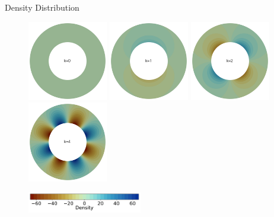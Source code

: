 \documentclass[10pt,aspectratio=169]{beamer}
\begin{document}
\begin{frame}[fragile]{Density Distribution}
	\begin{figure}[!htb]
		\begin{multicols}{4}
			\includegraphics[width=3.5cm]{./model_k_0_res_32_vdeg_2_pdeg_1_pcont_True_vel_penalty_1.0e+08_stokes_tol_1.0e-10/rho_ana.png}\par
			\hspace{0.75in}
			\includegraphics[width=3.5cm]{./model_k_1_res_32_vdeg_2_pdeg_1_pcont_True_vel_penalty_1.0e+08_stokes_tol_1.0e-10/rho_ana.png}\par
			\hspace{1.5in}
			\includegraphics[width=3.5cm]{./model_k_2_res_32_vdeg_2_pdeg_1_pcont_True_vel_penalty_1.0e+08_stokes_tol_1.0e-10/rho_ana.png}\par
			\hspace{2.25in}
			\includegraphics[width=3.5cm]{./model_k_4_res_32_vdeg_2_pdeg_1_pcont_True_vel_penalty_1.0e+08_stokes_tol_1.0e-10/rho_ana.png}\par
		\end{multicols}
	\end{figure}
	
	\vspace{-0.4in}
	
	\begin{figure}
		\hspace{0.2in} 
		\includegraphics[width=5cm]{./model_k_0_res_32_vdeg_2_pdeg_1_pcont_True_vel_penalty_1.0e+08_stokes_tol_1.0e-10/rho_ana_cbhorz.pdf}
	\end{figure}
\end{frame}
\end{document}
